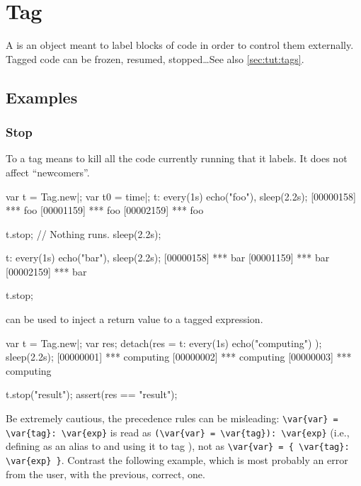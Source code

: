 
\section{Tag}

A  is an object meant to label blocks of code in order to
control them externally.  Tagged code can be frozen, resumed,
stopped\ldots See also \autoref{sec:tut:tags}.

\subsection{Examples}

\subsubsection{Stop}
\label{sec:specs:tag:stop}

To  a tag means to kill all the code currently running that
it labels.  It does not affect ``newcomers''.

\begin{urbiscript}[firstnumber=1]
var t = Tag.new|;
var t0 = time|;
t: every(1s) echo("foo"),
sleep(2.2s);
[00000158] *** foo
[00001159] *** foo
[00002159] *** foo

t.stop;
// Nothing runs.
sleep(2.2s);

t: every(1s) echo("bar"),
sleep(2.2s);
[00000158] *** bar
[00001159] *** bar
[00002159] *** bar

t.stop;
\end{urbiscript}

 can be used to inject a return value to a
tagged expression.

\begin{urbiscript}[firstnumber=1]
var t = Tag.new|;
var res;
detach(res = { t: every(1s) echo("computing") });
sleep(2.2s);
[00000001] *** computing
[00000002] *** computing
[00000003] *** computing

t.stop("result");
assert(res == "result");
\end{urbiscript}

Be extremely cautious, the precedence rules can be
misleading: \lstinline|\var{var} = \var{tag}: \var{exp}| is read as
\lstinline|(\var{var} = \var{tag}): \var{exp}| (i.e., defining
 as an alias to  and using it to tag ), not as
\lstinline|\var{var} = { \var{tag}: \var{exp} }|.  Contrast the
following example, which is most probably an error from the user, with
the previous, correct, one.

